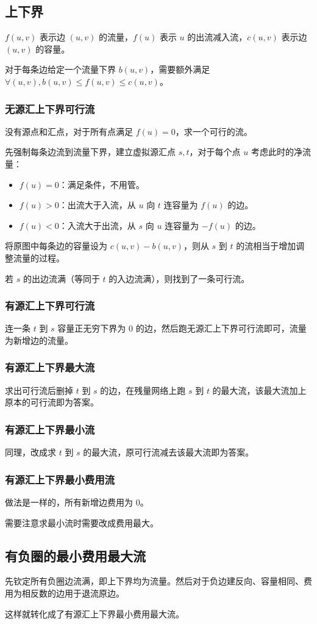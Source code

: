 \subsection{上下界}

\begin{tcolorbox}
$f(u, v)$ 表示边 $(u, v)$ 的流量，$f(u)$ 表示 $u$ 的出流减入流，$c(u, v)$ 表示边 $(u, v)$ 的容量。

对于每条边给定一个流量下界 $b(u, v)$，需要额外满足 $\forall (u, v), b(u, v) \le f(u, v) \le c(u, v)$。
\end{tcolorbox}

\subsubsection{无源汇上下界可行流}

没有源点和汇点，对于所有点满足 $f(u) = 0$，求一个可行的流。

先强制每条边流到流量下界，建立虚拟源汇点 $s, t$，对于每个点 $u$ 考虑此时的净流量：

\begin{itemize}
    \item $f(u) = 0$：满足条件，不用管。
    \item $f(u) > 0$：出流大于入流，从 $u$ 向 $t$ 连容量为 $f(u)$ 的边。
    \item $f(u) < 0$：入流大于出流，从 $s$ 向 $u$ 连容量为 $-f(u)$ 的边。
\end{itemize}

将原图中每条边的容量设为 $c(u, v) - b(u, v)$，则从 $s$ 到 $t$ 的流相当于增加调整流量的过程。

若 $s$ 的出边流满（等同于 $t$ 的入边流满），则找到了一条可行流。

\subsubsection{有源汇上下界可行流}

连一条 $t$ 到 $s$ 容量正无穷下界为 $0$ 的边，然后跑无源汇上下界可行流即可，流量为新增边的流量。

\subsubsection{有源汇上下界最大流}

求出可行流后删掉 $t$ 到 $s$ 的边，在残量网络上跑 $s$ 到 $t$ 的最大流，该最大流加上原本的可行流即为答案。

\subsubsection{有源汇上下界最小流}

同理，改成求 $t$ 到 $s$ 的最大流，原可行流减去该最大流即为答案。

\subsubsection{有源汇上下界最小费用流}

做法是一样的，所有新增边费用为 $0$。

需要注意求最小流时需要改成费用最大。

\subsection{有负圈的最小费用最大流}

先钦定所有负圈边流满，即上下界均为流量。然后对于负边建反向、容量相同、费用为相反数的边用于退流原边。

这样就转化成了有源汇上下界最小费用最大流。